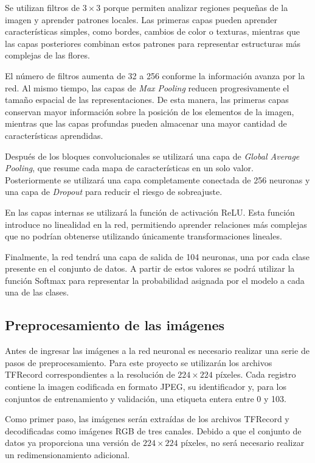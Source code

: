 Se utilizan filtros de $3 \times 3$ porque permiten analizar regiones pequeñas de la imagen y aprender patrones locales. Las primeras capas pueden aprender características simples, como bordes, cambios de color o texturas, mientras que las capas posteriores combinan estos patrones para representar estructuras más complejas de las flores.

El número de filtros aumenta de 32 a 256 conforme la información avanza por la red. Al mismo tiempo, las capas de \textit{Max Pooling} reducen progresivamente el tamaño espacial de las representaciones. De esta manera, las primeras capas conservan mayor información sobre la posición de los elementos de la imagen, mientras que las capas profundas pueden almacenar una mayor cantidad de características aprendidas.

Después de los bloques convolucionales se utilizará una capa de \textit{Global Average Pooling}, que resume cada mapa de características en un solo valor. Posteriormente se utilizará una capa completamente conectada de 256 neuronas y una capa de \textit{Dropout} para reducir el riesgo de sobreajuste.

En las capas internas se utilizará la función de activación ReLU. Esta función introduce no linealidad en la red, permitiendo aprender relaciones más complejas que no podrían obtenerse utilizando únicamente transformaciones lineales.

Finalmente, la red tendrá una capa de salida de 104 neuronas, una por cada clase presente en el conjunto de datos. A partir de estos valores se podrá utilizar la función Softmax para representar la probabilidad asignada por el modelo a cada una de las clases.


\subsection{Preprocesamiento de las imágenes}

Antes de ingresar las imágenes a la red neuronal es necesario realizar una serie de pasos de preprocesamiento. Para este proyecto se utilizarán los archivos TFRecord correspondientes a la resolución de $224 \times 224$ píxeles. Cada registro contiene la imagen codificada en formato JPEG, su identificador y, para los conjuntos de entrenamiento y validación, una etiqueta entera entre 0 y 103.

Como primer paso, las imágenes serán extraídas de los archivos TFRecord y decodificadas como imágenes RGB de tres canales. Debido a que el conjunto de datos ya proporciona una versión de $224 \times 224$ píxeles, no será necesario realizar un redimensionamiento adicional.

